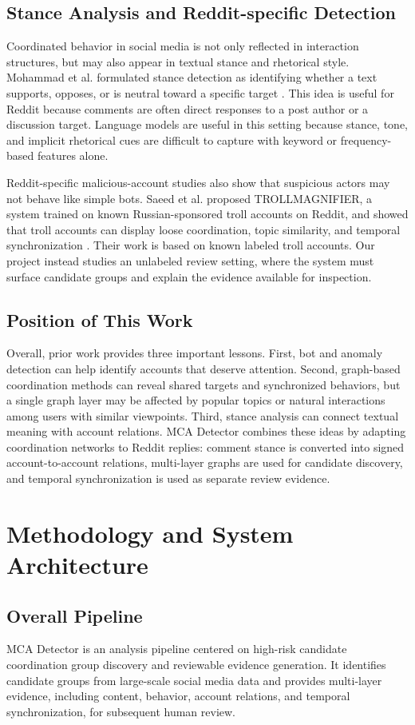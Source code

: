 \documentclass[conference]{IEEEtran}
\begin{document}
\subsection{Stance Analysis and Reddit-specific Detection}
Coordinated behavior in social media is not only reflected in interaction structures, but may also appear in textual stance and rhetorical style. Mohammad et al. formulated stance detection as identifying whether a text supports, opposes, or is neutral toward a specific target \cite{b7}. This idea is useful for Reddit because comments are often direct responses to a post author or a discussion target. Language models are useful in this setting because stance, tone, and implicit rhetorical cues are difficult to capture with keyword or frequency-based features alone.

Reddit-specific malicious-account studies also show that suspicious actors may not behave like simple bots. Saeed et al. proposed TROLLMAGNIFIER, a system trained on known Russian-sponsored troll accounts on Reddit, and showed that troll accounts can display loose coordination, topic similarity, and temporal synchronization \cite{b8}. Their work is based on known labeled troll accounts. Our project instead studies an unlabeled review setting, where the system must surface candidate groups and explain the evidence available for inspection.

\subsection{Position of This Work}
Overall, prior work provides three important lessons. First, bot and anomaly detection can help identify accounts that deserve attention. Second, graph-based coordination methods can reveal shared targets and synchronized behaviors, but a single graph layer may be affected by popular topics or natural interactions among users with similar viewpoints. Third, stance analysis can connect textual meaning with account relations. MCA Detector combines these ideas by adapting coordination networks to Reddit replies: comment stance is converted into signed account-to-account relations, multi-layer graphs are used for candidate discovery, and temporal synchronization is used as separate review evidence.

\section{Methodology and System Architecture}
\subsection{Overall Pipeline}
MCA Detector is an analysis pipeline centered on high-risk candidate coordination group discovery and reviewable evidence generation. It identifies candidate groups from large-scale social media data and provides multi-layer evidence, including content, behavior, account relations, and temporal synchronization, for subsequent human review.
\end{document}
